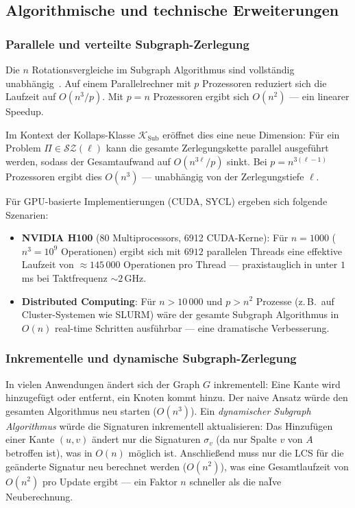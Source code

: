 ﻿\documentclass[a4paper,12pt]{article}
\theoremstyle{definition}
\begin{document}
\subsection{Algorithmische und technische Erweiterungen}

\subsubsection{Parallele und verteilte Subgraph-Zerlegung}

Die $n$ Rotationsvergleiche im Subgraph Algorithmus sind vollständig unabhängig~\cite{epp2026subgraph}.
Auf einem Parallelrechner mit $p$ Prozessoren reduziert sich die Laufzeit auf $O(n^3 / p)$.
Mit $p = n$ Prozessoren ergibt sich $O(n^2)$ --- ein linearer Speedup.

Im Kontext der Kollaps-Klasse $\mathcal{K}_\mathrm{Sub}$ eröffnet dies eine neue Dimension:
Für ein Problem $\Pi \in \mathcal{SZ}(\ell)$ kann die gesamte Zerlegungskette parallel
ausgeführt werden, sodass der Gesamtaufwand auf $O(n^{3\ell}/p)$ sinkt.
Bei $p = n^{3(\ell-1)}$ Prozessoren ergibt dies $O(n^3)$ --- unabhängig von der
Zerlegungstiefe $\ell$.

Für GPU-basierte Implementierungen (CUDA, SYCL) ergeben sich folgende Szenarien:
\begin{itemize}
  \item \textbf{NVIDIA H100} (80 Multiprocessors, 6912 CUDA-Kerne): Für $n = 1000$
        ($n^3 = 10^9$ Operationen) ergibt sich mit $6912$ parallelen Threads
        eine effektive Laufzeit von $\approx 145\,000$ Operationen pro Thread ---
        praxistauglich in unter $1$\,ms bei Taktfrequenz $\sim 2$\,GHz.
  \item \textbf{Distributed Computing}: Für $n > 10\,000$ und $p > n^2$ Prozesse
        (z.\,B.\ auf Cluster-Systemen wie SLURM) wäre der gesamte Subgraph Algorithmus
        in $O(n)$ real-time Schritten ausführbar --- eine dramatische Verbesserung.
\end{itemize}

\subsubsection{Inkrementelle und dynamische Subgraph-Zerlegung}

In vielen Anwendungen ändert sich der Graph $G$ inkrementell:
Eine Kante wird hinzugefügt oder entfernt, ein Knoten kommt hinzu.
Der naive Ansatz würde den gesamten Algorithmus neu starten ($O(n^3)$).
Ein \emph{dynamischer Subgraph Algorithmus} würde die Signaturen inkrementell
aktualisieren: Das Hinzufügen einer Kante $(u,v)$ ändert nur die Signaturen
$\sigma_v$ (da nur Spalte $v$ von $A$ betroffen ist), was in $O(n)$ möglich ist.
Anschließend muss nur die LCS für die geänderte Signatur neu berechnet werden
($O(n^2)$), was eine Gesamtlaufzeit von $O(n^2)$ pro Update ergibt ---
ein Faktor $n$ schneller als die naÏve Neuberechnung.
\end{document}
